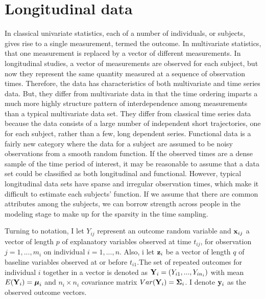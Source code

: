 \section{Longitudinal data}
In classical univariate statistics, each of a number of individuals, or subjects, gives rise to a single measurement, termed the outcome. In multivariate statistics, that one measurement is replaced by a vector of different measurements. In longitudinal studies, a vector of measurements are observed for each subject, but now they represent the same quantity measured at a sequence of observation times. Therefore, the data has characteristics of both multivariate and time series data. But, they differ from multivariate data in that the time ordering imparts a much more highly structure pattern of interdependence among measurements than a typical multivariate data set. They differ from classical time series data because the data consists of a large number of independent short trajectories, one for each subject, rather than a few, long dependent series. Functional data is a fairly new category \cite{ramsay2005} where the data for a subject are assumed to be noisy observations from a smooth random function. If the observed times are a dense sample of the time period of interest, it may be reasonable to assume that a data set could be classified as both longitudinal and functional. However, typical longitudinal data sets have sparse and irregular observation times, which make it difficult to estimate each subjects' function. If we assume that there are common attributes among the subjects, we can borrow strength across people in the modeling stage to make up for the sparsity in the time sampling. 

Turning to notation, I let $Y_{ij}$ represent an outcome random variable and $\mathbf x_{ij}$ a vector of length $p$ of explanatory variables observed at time $t_{ij}$, for observation $j=1,...,m_{i}$ on individual $i=1,...,n$. Also, i let $\mathbf z_{i}$ be a vector of length $q$ of baseline variables observed at or before $t_{i1}$.The set of repeated outcomes for individual $i$ together in a vector is denoted as $\mathbf Y_{i} = (Y_{i1},...,Y_{in_{i}})$ with mean $E(\mathbf Y_{i}) = \boldsymbol\mu_{i}$ and $n_{i}\times n_{i}$ covariance matrix $Var(\mathbf Y_{i}) = \mathbf\Sigma_{i}$. I denote $\mathbf y_{i}$ as the observed outcome vectors. 

